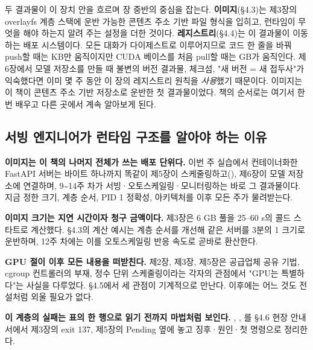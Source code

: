 두 결과물이 이 장치 안을 흐르며 장 중반의 중심을 잡는다. \textbf{이미지}(§4.3)는 제3장의 overlayfs 계층 스택에 운반 가능한 콘텐츠 주소 기반 파일 형식을 입히고, 런타임이 무엇을 해야 하는지 알려 주는 설정을 더한 것이다. \textbf{레지스트리}(§4.4)는 이 결과물이 이동하는 배포 시스템이다. 모든 대화가 다이제스트로 이루어지므로 코드 한 줄을 바꿔 push할 때는 KB만 움직이지만 CUDA 베이스를 처음 pull할 때는 GB가 움직인다. 제6장에서 모델 저장소를 만들 때 불변의 버전 결과물, 체크섬, "새 버전 = 새 접두사"가 익숙했다면 이미 몇 주 동안 이 장의 레지스트리 원칙을 \textit{사용}했기 때문이다. 이미지는 이 책이 콘텐츠 주소 기반 저장소로 운반한 첫 결과물이었다. 책의 순서로는 여기서 한 번 배우고 다른 곳에서 계속 알아보게 된다.

\subsection*{서빙 엔지니어가 런타임 구조를 알아야 하는 이유}

\begin{tbbitemize}
  \item \textbf{이미지는 이 책의 나머지 전체가 쓰는 배포 단위다.} 이번 주 실습에서 컨테이너화한 FastAPI 서버는 바이트 하나까지 똑같이 제5장이 스케줄링하고(), 제6장이 모델 저장소에 연결하며, 9\textasciitilde{}14주 차가 서빙·오토스케일링·모니터링하는 바로 그 결과물이다. 지금 정한 크기, 계층 순서, PID 1 정확성, 아키텍처를 이후 모든 주가 물려받는다.
  \item \textbf{이미지 크기는 지연 시간이자 청구 금액이다.} 제3장은 6 GB 풀을 25–60 s의 콜드 스타트로 계산했다. §4.3의 계산 예시는 계층 순서를 개선해 같은 서버를 3분의 1 크기로 운반하며, 12주 차에는 이를 오토스케일링 반응 속도로 곧바로 환산한다.
  \item \textbf{GPU 절이 이후 모든 내용을 떠받친다.} 제2장, 제3장, 제5장은 공급업체 공유 기법, cgroup 컨트롤러의 부재, 정수 단위 스케줄링이라는 각자의 관점에서 "GPU는 특별하다"는 사실을 다루었다. §4.5에서 세 관점이 기계적으로 만난다. 이후에는 어느 것도 전설처럼 외울 필요가 없다.
  \item \textbf{이 계층의 실패는 표의 한 행으로 읽기 전까지 마법처럼 보인다.} , , 를 §4.6 현장 안내서에서 제3장의 exit 137, 제5장의 Pending 옆에 놓고 징후·원인·첫 명령으로 정리한다.
\end{tbbitemize}

